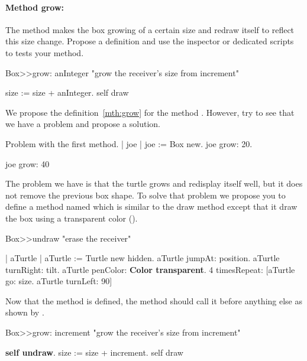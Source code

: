 \paragraph{Method grow:} The method  makes the box
growing of a certain size and redraw itself to reflect this size
change.  Propose a definition and  use the inspector or dedicated scripts to tests your method. 

\begin{method}\label{mth:grow}
Box>>grow: anInteger 
   "grow the receiver's size from increment"
   
    size := size + anInteger.
    self draw
\end{method}


We propose the definition~\ref{mth:grow} for the method .
However, try  to see that we have a problem and 
propose a solution.


\begin{scriptwithtitle}{Problem with the first  
method.}\label{scr:growProblem}
| joe |
joe := Box new.
joe grow: 20.

joe grow: 40
\end{scriptwithtitle}

The problem we have is that the turtle grows and redisplay itself 
well, but it does not remove the previous box shape. To solve that 
problem we propose you to define a method named  which 
is similar to the draw method except that it draw the box using a 
transparent color ().

\begin{method}\label{mt:undraw}
Box>>undraw
   "erase the receiver"
   
   | aTurtle |
   aTurtle := Turtle new hidden.
   aTurtle jumpAt: position.
   aTurtle turnRight: tilt.
   aTurtle penColor: \textbf{Color transparent}.
   4 timesRepeat: [aTurtle go: size.
                  aTurtle turnLeft: 90]
\end{method}

Now that the method  is defined, the method  should 
call it before anything else as shown by .

\begin{method}\label{mt:goodGrow}
Box>>grow: increment 
   "grow the receiver's size from increment"

   \textbf{self undraw}.
   size := size + increment.
   self draw
\end{method}


